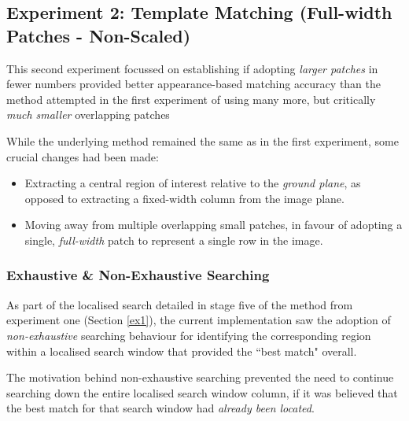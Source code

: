 \subsection{Experiment 2: Template Matching (Full-width Patches - Non-Scaled)}

This second experiment focussed on establishing if adopting \textit{larger patches} in fewer numbers provided better appearance-based matching accuracy than the method attempted in the first experiment of using many more, but critically \textit{much smaller} overlapping patches 

 While the underlying method remained the same as in the first experiment, some crucial changes had been made:
 
 \begin{itemize}
 	\item Extracting a central region of interest relative to the \textit{ground plane}, as opposed to extracting a fixed-width column from the image plane.
 	\item Moving away from multiple overlapping small patches, in favour of adopting a single, \textit{full-width} patch to represent a single row in the image. 
 \end{itemize}

\subsubsection{Exhaustive \& Non-Exhaustive Searching}
\label{searching}

As part of the localised search detailed in stage five of the method from experiment one (Section \ref{ex1}), the current implementation saw the adoption of \textit{non-exhaustive} searching behaviour for identifying the corresponding region within a localised search window that provided the ``best match" overall. 

The motivation behind non-exhaustive searching prevented the need to continue searching down the entire localised search window column, if it was believed that the best match for that search window had \textit{already been located}. 

